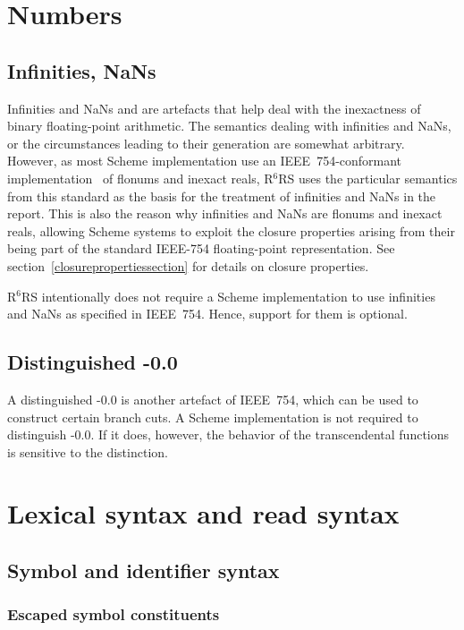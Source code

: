 \documentclass[twoside,twocolumn]{algol60}
\newcommand{\rn}[1]{R$^{#1}$RS}
\begin{document}
\chapter{Numbers}
\label{numberschapter}

\section{Infinities, NaNs}
\label{infinitiesnansection}

Infinities and NaNs and are artefacts that help
deal with the inexactness of binary floating-point arithmetic.  The
semantics dealing with infinities and NaNs, or the circumstances
leading to their generation are somewhat arbitrary.  However, as most
Scheme implementation use an IEEE~754-conformant
implementation~\cite{IEEE} of flonums and inexact reals, \rn{6} uses
the particular semantics from this standard as the basis for the
treatment of infinities and NaNs in the report.  This is also the
reason why infinities and NaNs are flonums and inexact reals, allowing
Scheme systems to exploit the closure properties arising from their
being part of the standard IEEE-754 floating-point representation.
See section~\ref{closurepropertiessection} for details on closure
properties.

\rn{6} intentionally does not require a Scheme implementation to use
infinities and NaNs as specified in IEEE~754.  Hence, support for them
is optional.

\section{Distinguished -0.0}
 
A distinguished -0.0 is another artefact of IEEE~754, which can be
used to construct certain branch cuts.  A Scheme implementation is not
required to distinguish -0.0.  If it does, however, the behavior of
the transcendental functions is sensitive to the distinction.  

\chapter{Lexical syntax and read syntax}

\section{Symbol and identifier syntax}

\subsection{Escaped symbol constituents}
\end{document}

